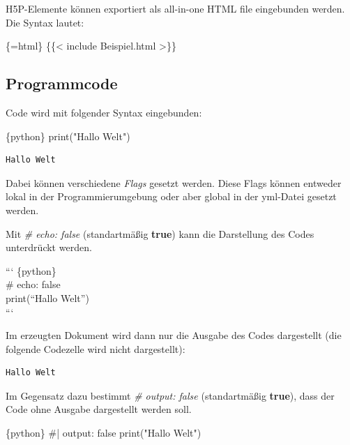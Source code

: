 \documentclass[
  letterpaper,
  DIV=11]{scrartcl}
\newenvironment{Shaded}{\begin{snugshade}}{\end{snugshade}}
\newcommand{\InformationTok}[1]{\textcolor[rgb]{0.37,0.37,0.37}{#1}}
\newcommand{\NormalTok}[1]{\textcolor[rgb]{0.00,0.23,0.31}{#1}}
\begin{document}
H5P-Elemente können exportiert als all-in-one HTML file eingebunden
werden. Die Syntax lautet:

\begin{Shaded}
\begin{Highlighting}[]
\NormalTok{\{=html\}}
\NormalTok{\{\{\textless{} include Beispiel.html \textgreater{}\}\}}
\end{Highlighting}
\end{Shaded}

\subsection{Programmcode}\label{programmcode-1}

Code wird mit folgender Syntax eingebunden:

\begin{Shaded}
\begin{Highlighting}[]
\InformationTok{\textasciigrave{}\textasciigrave{}\textasciigrave{}\{python\}}
\InformationTok{print("Hallo Welt")}
\InformationTok{\textasciigrave{}\textasciigrave{}\textasciigrave{}}
\end{Highlighting}
\end{Shaded}

\begin{verbatim}
Hallo Welt
\end{verbatim}

Dabei können verschiedene \emph{Flags} gesetzt werden. Diese Flags
können entweder lokal in der Programmierumgebung oder aber global in der
yml-Datei gesetzt werden.

Mit \emph{\#\textbar{} echo: false} (standartmäßig \textbf{true}) kann
die Darstellung des Codes unterdrückt werden.

``` \{python\}\\
\#\textbar{} echo: false\\
print(``Hallo Welt'')\\
```

Im erzeugten Dokument wird dann nur die Ausgabe des Codes dargestellt
(die folgende Codezelle wird nicht dargestellt):

\begin{verbatim}
Hallo Welt
\end{verbatim}

Im Gegensatz dazu bestimmt \emph{\#\textbar{} output: false}
(standartmäßig \textbf{true}), dass der Code ohne Ausgabe dargestellt
werden soll.

\begin{Shaded}
\begin{Highlighting}[]
\InformationTok{\textasciigrave{}\textasciigrave{}\textasciigrave{}\{python\}}
\InformationTok{\#| output: false}
\InformationTok{print("Hallo Welt")}
\InformationTok{\textasciigrave{}\textasciigrave{}\textasciigrave{}}
\end{Highlighting}
\end{Shaded}
\end{document}
